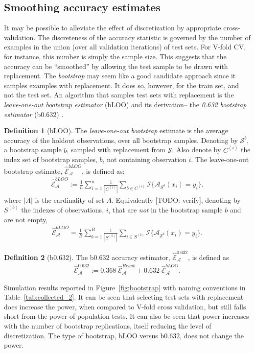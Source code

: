 \documentclass[12pt,a4paper]{article}
\theoremstyle{definition}
\newtheorem{definition}{Definition}
\newcommand{\set}[1]{\{ #1 \}} %
\newcommand{\indicator}[1]{\mathcal{I}{\set{#1}}} %
\newcommand{\features}{x} %
\newcommand{\outcomes}{y} %
\newcommand{\accEstim}{\hat{\mathcal{E}}}
\newcommand{\hypFun}[2]{\algo_{#1}(#2)} %
\newcommand{\algo}{\mathcal{A}}
\newcommand{\data}{\mathcal{S}}
\begin{document}
\subsection{Smoothing accuracy estimates}
\label{sec:bootstrap}
It may be possible to alleviate the effect of discretization by appropriate cross-validation. 
The discreteness of the accuracy statistic is governed by the number of examples in the union (over all validation iterations) of test sets.
For V-fold CV, for instance, this number is simply the sample size. 
This suggests that the accuracy can be ``smoothed'' by allowing the test sample to be drawn with replacement. 
The \emph{bootstrap} may seem like a good candidate approach since it samples examples with replacement. 
It does so, however, for the train set, and not the test set. 
An algorithm that samples test sets with replacement is the \emph{leave-one-out bootstrap estimator} (bLOO) and its derivation-- the \emph{0.632 bootstrap estimator} (b$0.632$) \citep[Sec 7.11]{hastie_elements_2003}.
\begin{definition}[bLOO]
\label{def:bloo}
The \emph{leave-one-out bootstrap} estimate is the average accuracy of the holdout observations, over all bootstrap samples. 
Denoting by $\data^b$, a bootstrap sample $b$, sampled with replacement from $\data$. 
Also denote by $C^{(i)}$ the index set of bootstrap samples, $b$, not containing observation $i$.
The leave-one-out bootstrap estimate, $\accEstim_{\algo}^{bLOO}$,  is defined as:
\begin{align}
		\accEstim_{\algo}^{bLOO}:= \frac 1n \sum_{i=1}^{n} \frac{1}{|C^{(i)}|} \sum_{b \in C^{(i)}} \indicator{\hypFun{\data^b}{\features_i}=\outcomes_i}.
\end{align}
where $|A|$ is the cardinality of set $A$.
Equivalently [TODO: verify], denoting by $S^{(b)}$ the indexes of observations, $i$, that are \emph{not} in the bootstrap sample $b$ and are not empty, 
\begin{align}
	\accEstim_{\algo}^{bLOO} = \frac 1B \sum_{b=1}^{B} \frac{1}{|S^{(b)}|} \sum_{i \in S^{(b)}} \indicator{\hypFun{\data^b}{\features_i}=\outcomes_i}.
\end{align}
\end{definition}

\begin{definition}[b$0.632$]
\label{def:b0632}
The b$0.632$ accuracy estimator, $\accEstim_{\algo}^{0.632}$, is defined as 
\begin{align}
	\accEstim_{\algo}^{0.632} := 0.368 \; \accEstim_{\algo}^{Resub}  + 0.632 \; \accEstim_{\algo}^{bLOO}.
\end{align}
\end{definition}
Simulation results reported in Figure~\ref{fig:bootstrap} with naming conventions in Table~\ref{tab:collected_2}.
It can be seen that selecting test sets with replacement does increase the power, when compared to V-fold cross validation, but still falls short from the power of population tests. 
It can also be seen that power increases with the number of bootstrap replications, itself reducing the level of discretization. 
The type of bootstrap, bLOO versus b$0.632$, does not change the power. 
\end{document}
